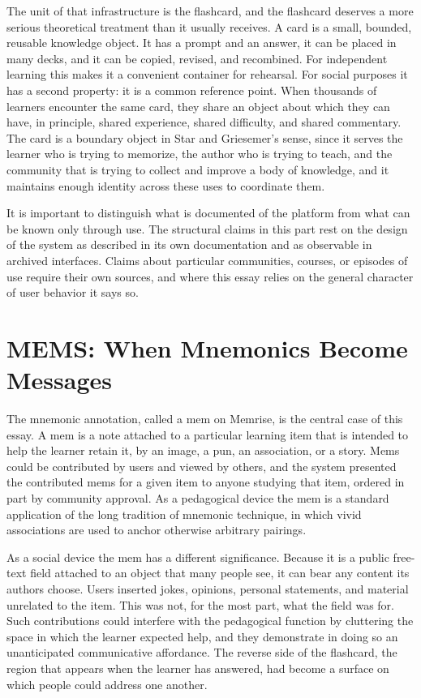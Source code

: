 \documentclass[11pt]{article}
\theoremstyle{remark}
\begin{document}
The unit of that infrastructure is the flashcard, and the flashcard deserves a more serious theoretical treatment than it usually receives. A card is a small, bounded, reusable knowledge object. It has a prompt and an answer, it can be placed in many decks, and it can be copied, revised, and recombined. For independent learning this makes it a convenient container for rehearsal. For social purposes it has a second property: it is a common reference point. When thousands of learners encounter the same card, they share an object about which they can have, in principle, shared experience, shared difficulty, and shared commentary. The card is a boundary object in Star and Griesemer's sense, since it serves the learner who is trying to memorize, the author who is trying to teach, and the community that is trying to collect and improve a body of knowledge, and it maintains enough identity across these uses to coordinate them.

It is important to distinguish what is documented of the platform from what can be known only through use. The structural claims in this part rest on the design of the system as described in its own documentation and as observable in archived interfaces. Claims about particular communities, courses, or episodes of use require their own sources, and where this essay relies on the general character of user behavior it says so.

\section{MEMS: When Mnemonics Become Messages}

The mnemonic annotation, called a mem on Memrise, is the central case of this essay. A mem is a note attached to a particular learning item that is intended to help the learner retain it, by an image, a pun, an association, or a story. Mems could be contributed by users and viewed by others, and the system presented the contributed mems for a given item to anyone studying that item, ordered in part by community approval. As a pedagogical device the mem is a standard application of the long tradition of mnemonic technique, in which vivid associations are used to anchor otherwise arbitrary pairings.

As a social device the mem has a different significance. Because it is a public free-text field attached to an object that many people see, it can bear any content its authors choose. Users inserted jokes, opinions, personal statements, and material unrelated to the item. This was not, for the most part, what the field was for. Such contributions could interfere with the pedagogical function by cluttering the space in which the learner expected help, and they demonstrate in doing so an unanticipated communicative affordance. The reverse side of the flashcard, the region that appears when the learner has answered, had become a surface on which people could address one another.
\end{document}
